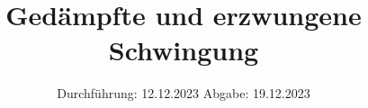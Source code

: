 

\subject{V354}
\title{Gedämpfte und erzwungene Schwingung}
\date{%
  Durchführung: 12.12.2023
  \hspace{3em}
  Abgabe: 19.12.2023
}



\maketitle
\thispagestyle{empty}
\tableofcontents
\newpage






\printbibliography{}
\appendix
\setcounter{secnumdepth}{0}

